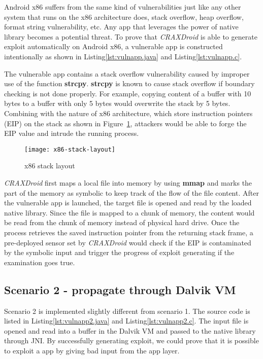 Android x86 suffers from the same kind of vulnerabilities just like any other
system that runs on the x86 architecture does, stack overflow, heap overflow,
format string vulnerability, etc. Any app that leverages the power of native
library becomes a potential threat. To prove that \emph{CRAXDroid} is able to
generate exploit automatically on Android x86, a vulnerable app is constructed
intentionally as shown in Listing\ref{lst:vulnapp.java} and
Listing\ref{lst:vulnapp.c}.

The vulnerable app contains a stack overflow vulnerability caused by improper
use of the function \textbf{strcpy}. \textbf{strcpy} is known to cause
stack overflow if boundary checking is not done properly. For example, copying
content of a buffer with 10 bytes to a buffer with only 5 bytes would overwrite
the stack by 5 bytes. Combining with the nature of x86 architecture, which
store instruction pointers (EIP) on the stack as shown in
Figure~\ref{fig:x86-stack-layout}, attackers would be able to forge the EIP
value and intrude the running process.

\begin{figure}[!ht]
  \texttt{[image: x86-stack-layout]}
  \caption{x86 stack layout}
  \label{fig:x86-stack-layout}
\end{figure}

\emph{CRAXDroid} first maps a local file into memory by using \textbf{mmap} and
marks the part of the memory as symbolic to keep track of the flow of the file
content. After the vulnerable app is launched, the target file is opened and
read by the loaded native library. Since the file is mapped to a chunk of
memory, the content would be read from the chunk of memory instead of physical
hard drive. Once the process retrieves the saved instruction pointer from the
returning stack frame, a pre-deployed sensor set by \emph{CRAXDroid} would
check if the EIP is contaminated by the symbolic input and trigger the
progress of exploit generating if the examination goes true.

\subsection{Scenario 2 - propagate through Dalvik VM}

Scenario 2 is implemented slightly different from scenario 1. The source code
is listed in Listing\ref{lst:vulnapp2.java} and Listing\ref{lst:vulnapp2.c}.
The input file is opened and read into a buffer in the Dalvik VM and passed to
the native library through JNI. By successfully generating exploit, we could
prove that it is possible to exploit a app by giving bad input from the app
layer.


